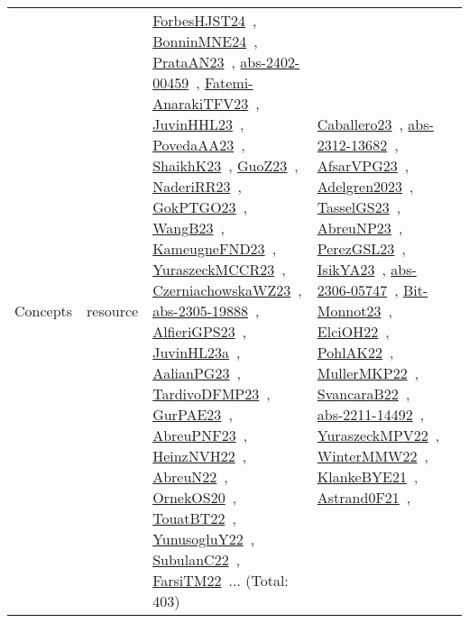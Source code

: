 {\begin{longtable}{lp{3cm}>{\raggedright\arraybackslash}p{6cm}>{\raggedright\arraybackslash}p{6cm}>{\raggedright\arraybackslash}p{8cm}}
Concepts & resource & \href{../works/ForbesHJST24.pdf}{ForbesHJST24}~\cite{ForbesHJST24}, \href{../works/BonninMNE24.pdf}{BonninMNE24}~\cite{BonninMNE24}, \href{../works/PrataAN23.pdf}{PrataAN23}~\cite{PrataAN23}, \href{../works/abs-2402-00459.pdf}{abs-2402-00459}~\cite{abs-2402-00459}, \href{../works/Fatemi-AnarakiTFV23.pdf}{Fatemi-AnarakiTFV23}~\cite{Fatemi-AnarakiTFV23}, \href{../works/JuvinHHL23.pdf}{JuvinHHL23}~\cite{JuvinHHL23}, \href{../works/PovedaAA23.pdf}{PovedaAA23}~\cite{PovedaAA23}, \href{../works/ShaikhK23.pdf}{ShaikhK23}~\cite{ShaikhK23}, \href{../works/GuoZ23.pdf}{GuoZ23}~\cite{GuoZ23}, \href{../works/NaderiRR23.pdf}{NaderiRR23}~\cite{NaderiRR23}, \href{../works/GokPTGO23.pdf}{GokPTGO23}~\cite{GokPTGO23}, \href{../works/WangB23.pdf}{WangB23}~\cite{WangB23}, \href{../works/KameugneFND23.pdf}{KameugneFND23}~\cite{KameugneFND23}, \href{../works/YuraszeckMCCR23.pdf}{YuraszeckMCCR23}~\cite{YuraszeckMCCR23}, \href{../works/CzerniachowskaWZ23.pdf}{CzerniachowskaWZ23}~\cite{CzerniachowskaWZ23}, \href{../works/abs-2305-19888.pdf}{abs-2305-19888}~\cite{abs-2305-19888}, \href{../works/AlfieriGPS23.pdf}{AlfieriGPS23}~\cite{AlfieriGPS23}, \href{../works/JuvinHL23a.pdf}{JuvinHL23a}~\cite{JuvinHL23a}, \href{../works/AalianPG23.pdf}{AalianPG23}~\cite{AalianPG23}, \href{../works/TardivoDFMP23.pdf}{TardivoDFMP23}~\cite{TardivoDFMP23}, \href{../works/GurPAE23.pdf}{GurPAE23}~\cite{GurPAE23}, \href{../works/AbreuPNF23.pdf}{AbreuPNF23}~\cite{AbreuPNF23}, \href{../works/HeinzNVH22.pdf}{HeinzNVH22}~\cite{HeinzNVH22}, \href{../works/AbreuN22.pdf}{AbreuN22}~\cite{AbreuN22}, \href{../works/OrnekOS20.pdf}{OrnekOS20}~\cite{OrnekOS20}, \href{../works/TouatBT22.pdf}{TouatBT22}~\cite{TouatBT22}, \href{../works/YunusogluY22.pdf}{YunusogluY22}~\cite{YunusogluY22}, \href{../works/SubulanC22.pdf}{SubulanC22}~\cite{SubulanC22}, \href{../works/FarsiTM22.pdf}{FarsiTM22}~\cite{FarsiTM22}... (Total: 403) & \href{../works/Caballero23.pdf}{Caballero23}~\cite{Caballero23}, \href{../works/abs-2312-13682.pdf}{abs-2312-13682}~\cite{abs-2312-13682}, \href{../works/AfsarVPG23.pdf}{AfsarVPG23}~\cite{AfsarVPG23}, \href{../works/Adelgren2023.pdf}{Adelgren2023}~\cite{Adelgren2023}, \href{../works/TasselGS23.pdf}{TasselGS23}~\cite{TasselGS23}, \href{../works/AbreuNP23.pdf}{AbreuNP23}~\cite{AbreuNP23}, \href{../works/PerezGSL23.pdf}{PerezGSL23}~\cite{PerezGSL23}, \href{../works/IsikYA23.pdf}{IsikYA23}~\cite{IsikYA23}, \href{../works/abs-2306-05747.pdf}{abs-2306-05747}~\cite{abs-2306-05747}, \href{../works/Bit-Monnot23.pdf}{Bit-Monnot23}~\cite{Bit-Monnot23}, \href{../works/ElciOH22.pdf}{ElciOH22}~\cite{ElciOH22}, \href{../works/PohlAK22.pdf}{PohlAK22}~\cite{PohlAK22}, \href{../works/MullerMKP22.pdf}{MullerMKP22}~\cite{MullerMKP22}, \href{../works/SvancaraB22.pdf}{SvancaraB22}~\cite{SvancaraB22}, \href{../works/abs-2211-14492.pdf}{abs-2211-14492}~\cite{abs-2211-14492}, \href{../works/YuraszeckMPV22.pdf}{YuraszeckMPV22}~\cite{YuraszeckMPV22}, \href{../works/WinterMMW22.pdf}{WinterMMW22}~\cite{WinterMMW22}, \href{../works/KlankeBYE21.pdf}{KlankeBYE21}~\cite{KlankeBYE21}, \href{../works/Astrand0F21.pdf}{Astrand0F21}~\cite{Astrand0F21}, 
\end{longtable}}
